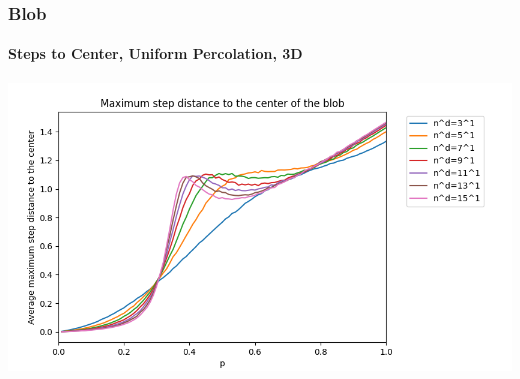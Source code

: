 \documentclass{beamer}
\begin{document}
	\begin{frame}
		\frametitle{Blob}
		\framesubtitle{Steps to Center, Uniform Percolation, 3D}
		\includegraphics[scale=0.5]{imgs/blob_step_3D_bis.png}
	\end{frame}
\end{document}
